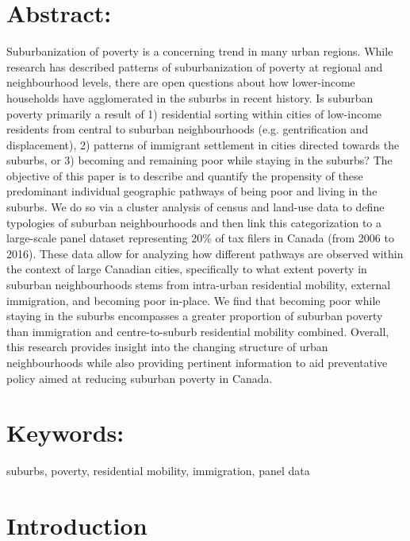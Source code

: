 

\section*{{Abstract:}}


	Suburbanization of poverty is a concerning trend in many urban regions. While research has described patterns of suburbanization of poverty at regional and neighbourhood levels, there are open questions about how lower-income households have agglomerated in the suburbs in recent history. Is suburban poverty primarily a result of 1) residential sorting within cities of low-income residents from central to suburban neighbourhoods (e.g. gentrification and displacement), 2) patterns of immigrant settlement in cities directed towards the suburbs, or 3) becoming and remaining poor while staying in the suburbs? The objective of this paper is to describe and quantify the propensity of these predominant individual geographic pathways of being poor and living in the suburbs. We do so via a cluster analysis of census and land-use data to define typologies of suburban neighbourhoods and then link this categorization to a large-scale panel dataset representing 20\% of tax filers in Canada (from 2006 to 2016). These data allow for analyzing how different pathways are observed within the context of large Canadian cities, specifically to what extent poverty in suburban neighbourhoods stems from intra-urban residential mobility, external immigration, and becoming poor in-place. We find that becoming poor while staying in the suburbs encompasses a greater proportion of suburban poverty than immigration and centre-to-suburb residential mobility combined. Overall, this research provides insight into the changing structure of urban neighbourhoods while also providing pertinent information to aid preventative policy aimed at reducing suburban poverty in Canada.
	


\section*{{Keywords:}}

suburbs, poverty, residential mobility, immigration, panel data



\section{Introduction}

